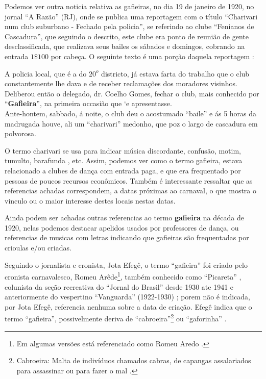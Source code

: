 Podemos ver outra noticia relativa as gafieiras, no dia 19 de janeiro de 1920, 
no jornal ``A Razão'' (RJ), onde se
publica uma reportagem com o título 
``Charivari num club suburbano - Fechado pela policia'',
se referindo ao clube ``Fenianos de Cascadura'',
que seguindo o descrito, este clube era 
ponto de reunião de gente desclassificada, 
que realizava seus bailes os sábados e domingos,
cobrando na entrada $1\$100$ por cabeça.
O seguinte texto é uma porção daquela reportagem \cite[pp. 4]{oldgafieira4} \cite[pp. 629]{spielmann2016reflexoes}:
\begin{citando}
A policia local, que é a do $20^o$ districto,
já estava farta do trabalho que o club 
constantemente lhe dava e de receber reclamações 
dos moradores visinhos.\\
Deliberou então o delegado, dr. Coelho
Gomes, fechar o club, mais conhecido por 
``\textbf{Gafieira}'', na primeira occasião que `e apresentasse.\\
Ante-hontem, sabbado, á noite, o club 
deu o acostumado ``baile'' e ás 5 horas da 
madrugada houve, ali um ``charivari'' medonho,
que poz o largo de cascadura em polvorosa. 
\end{citando}
O termo charivari se usa para indicar música discordante, 
confusão, motim, tumulto, barafunda \cite[pp. 53]{almeida1996dicionario}, etc.
Assim, podemos ver como o termo gafieira, 
estava relacionado a clubes de dança com entrada paga,
e que era frequentado por pessoas de poucos recursos econômicos. 
Também é interessante ressaltar que as referencias achadas correspondem,
a datas próximas ao carnaval, o que mostra o vinculo ou o maior interesse 
destes locais nestas datas. 

Ainda podem ser achadas outras referencias ao termo \textbf{gafieira} na década de 1920,
nelas podemos destacar apelidos usados por professores de dança,
ou referencias de musicas com letras indicando que gafieiras 
são frequentadas por crioulas e/ou criadas.



Seguindo o jornalista e cronista, Jota Efegê, %
o termo ``gafieira'' foi criado pelo cronista carnavalesco, 
Romeu Arêde\footnote{Em algumas versões está  referenciado como Romeu Aredo \cite[pp. 188]{raca1999}.}, 
também conhecido como ``Picareta'' \cite[pp. 3 - cad. 3]{juliosimoes} 
\cite[pp. 21]{efege1974maxixe} \cite[pp. 78]{coutinho2006cronistas}, 
colunista da seção recreativa do ``Jornal do Brasil'' desde 1930 ate 1941
e anteriormente do vespertino ``Vanguarda'' (1922-1930) \cite[pp. 58-59]{efege1982figuras} 
\cite[pp. 6 - cad. B]{entrevistajuliojournalbrasil1};
porem não é indicada, por Jota Efegê, referencia nenhuma sobre a data de criação.
Efegê indica que o termo ``gafieira'', possivelmente deriva de 
``cabroeira''\footnote{Cabroeira: Malta de indivíduos chamados cabras, 
de capangas assalariados para assassinar ou para fazer o mal \cite{diciocabroeira}.} 
ou ``gaforinha'' \cite[pp. 3 - cad. 3]{juliosimoes}.

